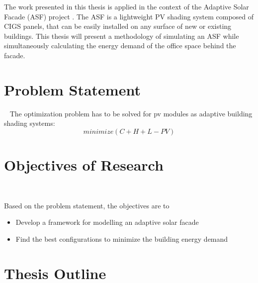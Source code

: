 	The work presented in this thesis is applied in the context of the Adaptive Solar Facade (ASF) project \cite{nagy2015frontiers}. The ASF is a lightweight PV shading system composed of CIGS panels, that can be easily installed on any surface of new or existing buildings. This thesis will present a methodology of simulating an ASF while simultaneously calculating the energy demand of the office space behind the facade.


\section{Problem Statement}\
	The optimization problem has to be solved for pv modules as adaptive building shading systems:\\
	\begin{equation}
			minimize(C+H+L-PV)
	      	\label{e:minimize}
	\end{equation}



\section{Objectives of Research}\

	Based on the problem statement, the objectives are to

	\begin{itemize}
		\item Develop a framework for modelling an adaptive solar facade
		\item Find the best configurations to minimize the building energy demand
	\end{itemize}


\section{Thesis Outline}\








